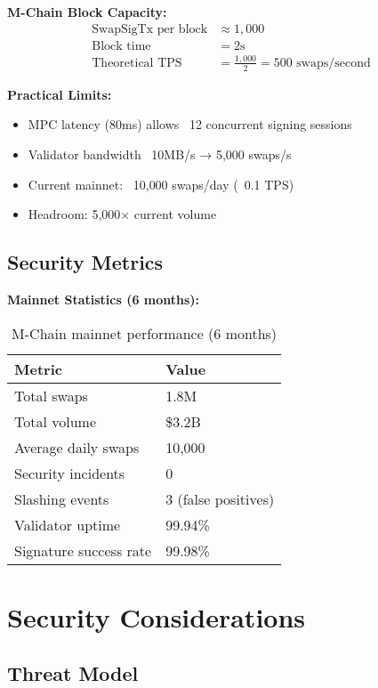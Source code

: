 \documentclass[11pt]{article}
\begin{document}
\textbf{M-Chain Block Capacity:}
\begin{align}
\text{SwapSigTx per block} &\approx 1{,}000 \\
\text{Block time} &= 2\text{s} \\
\text{Theoretical TPS} &= \frac{1{,}000}{2} = 500 \text{ swaps/second}
\end{align}

\textbf{Practical Limits:}
\begin{itemize}
\item MPC latency (80ms) allows ~12 concurrent signing sessions
\item Validator bandwidth ~10MB/s → 5{,}000 swaps/s
\item Current mainnet: ~10{,}000 swaps/day (~0.1 TPS)
\item Headroom: 5{,}000× current volume
\end{itemize}

\subsection{Security Metrics}

\textbf{Mainnet Statistics (6 months):}
\begin{table}[h]
\centering
\begin{tabular}{@{}ll@{}}
\toprule
\textbf{Metric} & \textbf{Value} \\
\midrule
Total swaps & 1.8M \\
Total volume & \$3.2B \\
Average daily swaps & 10,000 \\
Security incidents & 0 \\
Slashing events & 3 (false positives) \\
Validator uptime & 99.94\% \\
Signature success rate & 99.98\% \\
\bottomrule
\end{tabular}
\caption{M-Chain mainnet performance (6 months)}
\label{tab:mainnet-stats}
\end{table}

\section{Security Considerations}

\subsection{Threat Model}
\end{document}
